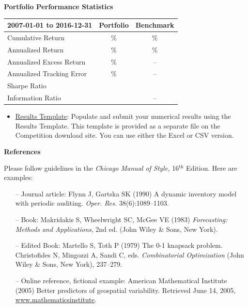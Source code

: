 \documentclass[11pt]{article}
\begin{document}
\begin{center}
\textbf{Portfolio Performance Statistics}\vspace*{-14pt}
\end{center}
\begin{table}[htbp]
\def\arraystretch{1.4}
\begin{center}
\begin{tabular}{|l|c|c|}
\hline
\textbf{2007-01-01 to 2016-12-31}& 
\textbf{Portfolio}& 
\textbf{Benchmark} \\
\hline
Cumulative Return& 
{\%}& 
{\%} \\
\hline
Annualized Return& 
{\%}& 
{\%} \\
\hline
Annualized Excess Return& 
{\%}& 
-- \\
\hline
Annualized Tracking Error& 
{\%}& 
-- \\
\hline
Sharpe Ratio& 
& 
 \\
\hline
Information Ratio& 
& 
-- \\
\hline
\end{tabular}
\label{tab1}
\end{center}
\end{table}

\begin{itemize}
\item \underline {Results Template}: Populate and submit your numerical results using the Results Template. This template is provided as a separate file on the Competition download site. You can use either the Excel or CSV version.
\end{itemize}

\textbf{References}

\bgroup
\parskip0pt

Please follow guidelines in the \textit{Chicago Manual of Style,} 16$^{\text{th}}$ Edition. Here are examples: 

\begin{itemize}
\item[--] Journal article: Flynn J, Gartska SK (1990) A dynamic inventory model with periodic auditing. \textit{Oper. Res.} 38(6):1089--1103. 
\item[--] Book: Makridakis S, Wheelwright SC, McGee VE (1983) \textit{Forecasting: Methods and Applications}, 2nd ed. (John Wiley {\&} Sons, New York). 
\item[--] Edited Book: Martello S, Toth P (1979) The 0-1 knapsack problem. Christofides N, Mingozzi A, Sandi C, eds. \textit{Combinatorial Optimization} (John Wiley {\&} Sons, New York), 237--279.
\item[--] Online reference, fictional example: American Mathematical Institute (2005) Better predictors of geospatial variability. Retrieved June 14, 2005, \underline {www.mathematicsinstitute}.

\end{itemize}

\egroup
\end{document}
